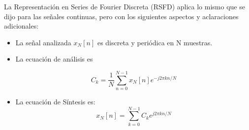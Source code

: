 La Representación en Series de Fourier Discreta (RSFD) aplica lo mismo que se dijo para las señales continuas, pero con los siguientes aspectos y aclaraciones adicionales:

\begin{itemize}
	\item  La señal analizada $x_{N}[n]$ es discreta y periódica en N muestras.
	\item  La ecuación de análisis es

\begin{equation} \label{equ_cuarenta}
			 C_{k} = \dfrac{1}{N} \sum_{n=0}^{N-1}x_{N} [n]e^{-j2 \pi kn/N}		
\end{equation}	
\item  La ecuación de Síntesis es:
\begin{equation} \label{equ_cuarentas}
			 x_{N}[n] = \sum_{k=0}^{N-1}C_{k} e^{j2 \pi kn/N}		
\end{equation}
\end{itemize}
